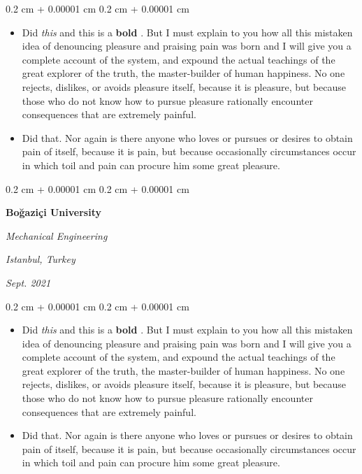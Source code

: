 \documentclass[10pt, letterpaper]{article}
\newenvironment{highlights}{
    \begin{itemize}[
        topsep=0.10 cm,
        parsep=0.10 cm,
        partopsep=0pt,
        itemsep=0pt,
        leftmargin=0.4 cm + 10pt
    ]
}{
    \end{itemize}
} %
\newenvironment{onecolentry}{
    \begin{adjustwidth}{
        0.2 cm + 0.00001 cm
    }{
        0.2 cm + 0.00001 cm
    }
}{
    \end{adjustwidth}
} %
\newenvironment{twocolentry}[2][]{
    \onecolentry
    \def\secondColumn{#2}
    \setcolumnwidth{\fill, 4.5 cm}
    \begin{paracol}{2}
}{
    \switchcolumn \raggedleft \secondColumn
    \end{paracol}
    \endonecolentry
} %
\let\hrefWithoutArrow\href
\renewcommand{\href}[2]{\hrefWithoutArrow{#1}{\mbox{\ifthenelse{\equal{#2}{}}{ }{#2 }\raisebox{.15ex}{\footnotesize \faExternalLink*}}}}
\begin{document}
        \vspace{0.10 cm-3px}
        \begin{onecolentry}
            \begin{highlights}
                \item Did \textit{this} and this is a \textbf{bold} \href{https://example.com}{link}. But I must explain to you how all this mistaken idea of denouncing pleasure and praising pain was born and I will give you a complete account of the system, and expound the actual teachings of the great explorer of the truth, the master-builder of human happiness. No one rejects, dislikes, or avoids pleasure itself, because it is pleasure, but because those who do not know how to pursue pleasure rationally encounter consequences that are extremely painful.
                \item Did that. Nor again is there anyone who loves or pursues or desires to obtain pain of itself, because it is pain, but because occasionally circumstances occur in which toil and pain can procure him some great pleasure.
            \end{highlights}
        \end{onecolentry}


        \vspace{0.2 cm-3px}

        \begin{twocolentry}{
        \textit{Istanbul, Turkey}    
            
        \textit{Sept. 2021}}
            \textbf{Boğaziçi University}

            \textit{Mechanical Engineering}
        \end{twocolentry}

        \vspace{0.10 cm-3px}
        \begin{onecolentry}
            \begin{highlights}
                \item Did \textit{this} and this is a \textbf{bold} \href{https://example.com}{link}. But I must explain to you how all this mistaken idea of denouncing pleasure and praising pain was born and I will give you a complete account of the system, and expound the actual teachings of the great explorer of the truth, the master-builder of human happiness. No one rejects, dislikes, or avoids pleasure itself, because it is pleasure, but because those who do not know how to pursue pleasure rationally encounter consequences that are extremely painful.
                \item Did that. Nor again is there anyone who loves or pursues or desires to obtain pain of itself, because it is pain, but because occasionally circumstances occur in which toil and pain can procure him some great pleasure.
            \end{highlights}
        \end{onecolentry}
\end{document}
